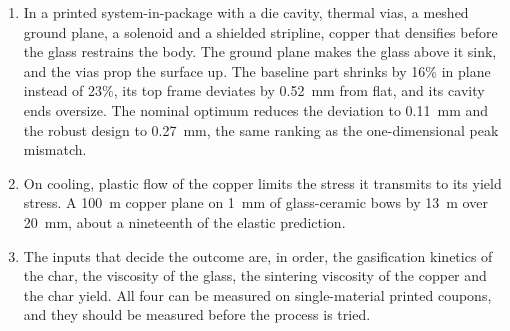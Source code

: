 \begin{enumerate}
\item In a printed system-in-package with a die cavity, thermal vias, a meshed ground plane, a solenoid and a shielded stripline, copper that densifies before the glass restrains the body. The ground plane makes the glass above it sink, and the vias prop the surface up. The baseline part shrinks by 16\% in plane instead of 23\%, its top frame deviates by 0.52~mm from flat, and its cavity ends oversize. The nominal optimum reduces the deviation to 0.11~mm and the robust design to 0.27~mm, the same ranking as the one-dimensional peak mismatch.
\item On cooling, plastic flow of the copper limits the stress it transmits to its yield stress. A 100~\textmu m copper plane on 1~mm of glass-ceramic bows by 13~\textmu m over 20~mm, about a nineteenth of the elastic prediction.
\item The inputs that decide the outcome are, in order, the gasification kinetics of the char, the viscosity of the glass, the sintering viscosity of the copper and the char yield. All four can be measured on single-material printed coupons, and they should be measured before the process is tried.
\end{enumerate}
